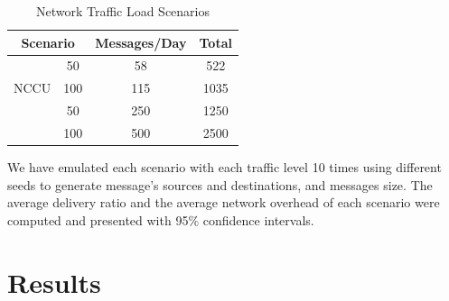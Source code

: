 \begin{table}[H]
\centering
\caption{Network Traffic Load Scenarios}
\label{tab:trafficLevels}
\begin{tabular}{|c|c|c|c|}
\hline
\multicolumn{2}{|c|}{\textbf{Scenario}} & \textbf{Messages/Day} & \textbf{Total} \\ \hline
\multirow{3}{*}{NCCU}       & 50        & 58                    & 522            \\ \cline{2-4}
                            & 100       & 115                   & 1035           \\ \hline
\multirow{3}{*}{SWIM}       & 50        & 250                   & 1250           \\ \cline{2-4}
                            & 100       & 500                   & 2500           \\ \hline
\end{tabular}
\end{table}

We have emulated each scenario with each traffic level 10 times using different seeds to generate message's sources and destinations, and messages size.
The average delivery ratio and the average network overhead of each scenario were computed and presented with 95\% confidence intervals.

\section{Results}
\label{sec:results}

